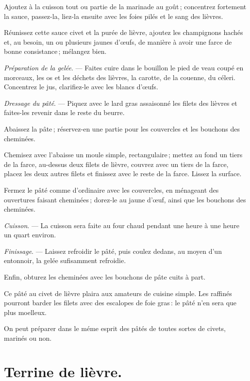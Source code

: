 Ajoutez à la cuisson tout ou partie de la marinade au goût ; concentrez
fortement la sauce, passez-la, liez-la ensuite avec les foies pilés et le sang
des lièvres.

Réunissez cette sauce civet et la purée de lièvre, ajoutez les champignons
hachés et, au besoin, un ou plusieurs jaunes d'œufs, de manière à avoir une
farce de bonne consistance ; mélangez bien.

\medskip

\textit{Préparation de la gelée}. — Faites cuire dans le bouillon le pied de
veau coupé en morceaux, les os et les déchets des lièvres, la carotte, de la
couenne, du céleri. Concentrez le jus, clarifiez-le avec les blancs d'œufs.

\medskip

\textit{Dressage du pâté}. — Piquez avec le lard gras assaisonné les filets des
lièvres et faites-les revenir dans le reste du beurre.

Abaissez la pâte ; réservez-en une partie pour les couvercles et les bouchons
des cheminées.

Chemisez avec l'abaisse un moule simple, rectangulaire ; mettez au fond un
tiers de la farce, au-dessus deux filets de lièvre, couvrez avec un tiers de la
farce, placez les deux autres filets et finissez avec le reste de la farce.
Lissez la surface.

Fermez le pâté comme d'ordinaire avec les couvercles, en ménageant des
ouvertures faisant cheminées ; dorez-le au jaune d'œuf, ainsi que les bouchons
des cheminées.

\medskip

\textit{Cuisson}. — La cuisson sera faite au four chaud pendant une heure à une
heure un quart environ.

\medskip

\textit{Finissage}. — Laissez refroidir le pâté, puis coulez dedans, au moyen
d'un entonnoir, la gelée sufisamment refroidie.

\medskip

Enfin, obturez les cheminées avec les bouchons de pâte cuits à part.

Ce pâté au civet de lièvre plaira aux amateurs de cuisine simple. Les raffinés
pourront barder les filets avec des escalopes de foie gras : le pâté n'en sera
que plus moelleux.

\sk

On peut préparer dans le méme esprit des pâtés de toutes sortes de civets,
marinés ou non.

\section*{\centering Terrine de lièvre.}
{}
\label{pg0672} \hypertarget{p0672}{}

